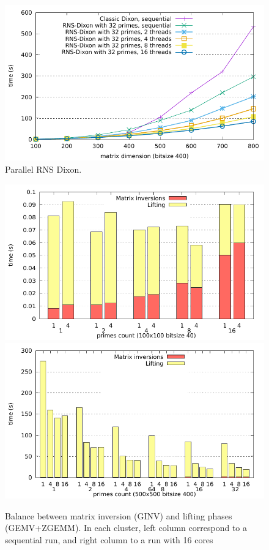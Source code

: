 \begin{figure}[htb]
\begin{center}
  \includegraphics[width=.8\textwidth]{Pictures/RNSDixon/parallel-threads}
\end{center}
\caption{Parallel RNS Dixon.}\label{fig:rnsdixon_parallel_threads}
\end{figure}

\begin{figure}[htb]
\begin{center}
  \includegraphics[width=.8\textwidth]{Pictures/RNSDixon/parallel-detailed_100n_40b}
  \includegraphics[width=.8\textwidth]{Pictures/RNSDixon/parallel-detailed_500n_400b_total}
\end{center}
\caption{Balance between matrix inversion (GINV) and lifting phases (GEMV+ZGEMM). In each cluster, left column correspond to a sequential run,
and right column to a run with 16 cores}\label{fig:rnsdixon_parallel}
\end{figure}

